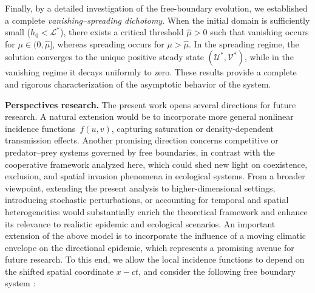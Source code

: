 \documentclass[a4paper,11pt]{amsart}
\theoremstyle{definition}
\numberwithin{equation}{section}
\theoremstyle{definition}
\begin{document}
Finally, by a detailed investigation of the free-boundary evolution,
we established a complete \emph{vanishing–spreading dichotomy}.
When the initial domain is sufficiently small ($h_0<\mathcal L^\ast$),
there exists a critical threshold $\widehat{\mu}>0$ such that vanishing occurs for $\mu\in(0,\widehat{\mu}]$,
whereas spreading occurs for $\mu>\widehat{\mu}$.
In the spreading regime, the solution converges to the unique positive steady state
$(\mathscr U^\ast,\mathscr V^\ast)$,
while in the vanishing regime it decays uniformly to zero.
These results provide a complete and rigorous characterization of the asymptotic behavior of the system.




\medskip
\noindent\textbf{Perspectives research.}
The present work opens several directions for future research.
A natural extension would be to incorporate more general nonlinear incidence functions~$f(u,v)$,
capturing saturation or density-dependent transmission effects.
Another promising direction concerns competitive or predator–prey systems governed by free boundaries,
in contrast with the cooperative framework analyzed here,
which could shed new light on coexistence, exclusion, and spatial invasion phenomena in ecological systems.
From a broader viewpoint, extending the present analysis to higher-dimensional settings,
introducing stochastic perturbations, or accounting for temporal and spatial heterogeneities
would substantially enrich the theoretical framework
and enhance its relevance to realistic epidemic and ecological scenarios. An important extension of the above model is to incorporate the influence of a moving climatic envelope on the directional epidemic,
which represents a promising avenue for future research.
To this end, we allow the local incidence functions to depend on the shifted spatial coordinate $x-ct$, and consider the following free boundary system :
\end{document}
